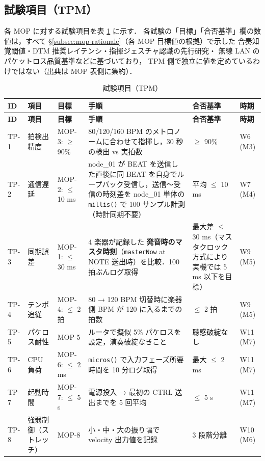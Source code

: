 \documentclass[lualatex,book,paper=a4paper,jafontsize=11.5pt,jafontscale=1.05]{jlreq}
\begin{document}
\subsection{試験項目（TPM）}

各 MOP に対する試験項目を表 \ref{tab:tpm-list} に示す．
各試験の「目標」「合否基準」欄の数値は，すべて
\S\ref{subsec:mop-rationale}（各 MOP 目標値の根拠）で示した
合奏知覚閾値・DTM 推奨レイテンシ・指揮ジェスチャ認識の先行研究・
無線 LAN のパケットロス品質基準などに基づいており，
TPM 側で独立に値を定めているわけではない（出典は MOP 表側に集約）．

\begin{longtable}{p{} p{} p{} p{} p{} p{}}
\caption{試験項目（TPM）}\label{tab:tpm-list}\\
\toprule
\textbf{ID} & \textbf{項目} & \textbf{目標} & \textbf{手順} & \textbf{合否基準} & \textbf{時期} \\
\midrule
\endfirsthead
\toprule
\textbf{ID} & \textbf{項目} & \textbf{目標} & \textbf{手順} & \textbf{合否基準} & \textbf{時期} \\
\midrule
\endhead
TP-1 & 拍検出精度  & MOP-3: $\geq$ 90\% & 80/120/160 BPM のメトロノームに合わせて指揮し，30 秒の検出 vs 実拍数 & $\geq$ 90\% & W6 (M3) \\
TP-2 & 通信遅延    & MOP-2: $\leq$ 10 ms & node\_01 が BEAT を送信した直後に同 BEAT を自身でループバック受信し，送信〜受信の時刻差を node\_01 単体の \texttt{millis()} で 100 サンプル計測（時計同期不要） & 平均 $\leq$ 10 ms & W7 (M4) \\
TP-3 & 同期誤差    & MOP-1: $\leq$ 30 ms & 4 楽器が記録した \textbf{発音時のマスタ時刻}（\texttt{masterNow} at NOTE 送出時）を比較．100 拍ぶんログ取得 & 最大差 $\leq$ 30 ms（マスタクロック方式により実機では 5 ms 以下を目標） & W9 (M5) \\
TP-4 & テンポ追従  & MOP-4: $\leq$ 2 拍 & 80 → 120 BPM 切替時に楽器側 BPM が 120 に入るまでの拍数 & $\leq$ 2 拍 & W9 (M5) \\
TP-5 & パケロス耐性 & MOP-5            & ルータで擬似 5\% パケロスを設定，演奏破綻なきこと & 聴感破綻なし & W11 (M7) \\
TP-6 & CPU 負荷    & MOP-6: $\leq$ 2 ms & \texttt{micros()} で入力フェーズ所要時間を 10 分ログ取得 & 最大 $\leq$ 2 ms & W11 (M7) \\
TP-7 & 起動時間    & MOP-7: $\leq$ 5 s  & 電源投入 → 最初の CTRL 送出までを 5 回平均 & $\leq$ 5 s & W11 (M7) \\
TP-8 & 強弱制御（ストレッチ）& MOP-8 & 小・中・大の振り幅で velocity 出力値を記録 & 3 段階分離 & W10 (M6) \\
\bottomrule
\end{longtable}
\end{document}
